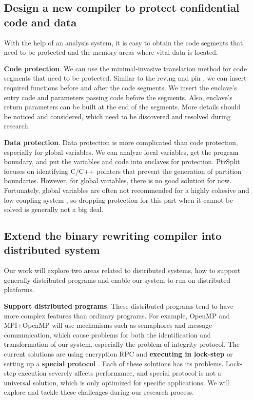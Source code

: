 \subsection{Design a new compiler to protect confidential code and data}
\label{sec:ToolToRewrite}
With the help of an analysis system, it is easy to obtain the code segments that need
to be protected and the memory areas where vital data is located.

\textbf{Code protection}. We can use the minimal-invasive translation method for
code segments that need to be protected. Similar to the rev.ng \cite{Federico2017revngAU}
and pin \cite{Luk2005PinBC}, we can insert required functions before and
after the code segments. We insert the enclave's entry code and parameters passing code
before the segments. Also, enclave's return parameters can be built at the end of the segments.
More details should be noticed and considered, which need to be
discovered and resolved during research.

\textbf{Data protection}. Data protection is more complicated than code protection,
especially for global variables.
We can analyze local variables, get the program boundary, and put the
variables and code into enclaves for protection.
PtrSplit \cite{Liu2017PtrSplitSG} focuses on identifying C/C++ pointers
that prevent the generation of partition boundaries.
However, for global variables, there is no good solution for now. Fortunately,
global variables are often not recommended for a highly cohesive and low-coupling system
\cite{GlobalVariablesAreBad, GlobalVariablesAreEvil},
so dropping protection for this part when it cannot be solved is generally not a big deal.

\subsection{Extend the binary rewriting compiler into distributed system}
\label{sec:ToolToDistributedSystem}
Our work will explore two areas related to distributed systems, how to support generally distributed
programs and enable our system to run on distributed platforms.

\textbf{Support distributed programs}.
These distributed programs tend to have more complex features than ordinary programs.
For example, OpenMP \cite{Dagum1998OpenMPAI} and MPI+OpenMP \cite{Klinkenberg2020CHAMELEONRL}
will use mechanisms such as semaphores and message communication, which cause problems
for both the identification and transformation of our system, especially the problem of integrity protocol.
The current solutions are using encryption RPC and \textbf{executing in lock-step} \cite{Shinde2017PanoplyLL}
or setting up a \textbf{special protocol} \cite{Schuster2015VC3TD, Priebe2018EnclaveDBAS}.
Each of these solutions has its problems. Lock-step execution severely affects performance,
and special protocol is not a universal solution, which is only optimized for specific applications.
We will explore and tackle these challenges during our research process.

